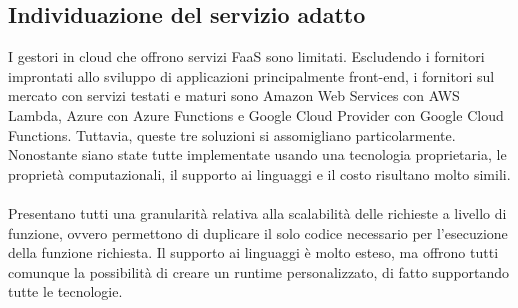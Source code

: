 \subsection{Individuazione del servizio adatto}

I gestori in cloud che offrono servizi FaaS sono limitati.
Escludendo i fornitori improntati allo sviluppo di applicazioni principalmente front-end,
i fornitori sul mercato con servizi testati e maturi sono
Amazon Web Services con AWS Lambda, 
Azure con Azure Functions e
Google Cloud Provider con Google Cloud Functions.
Tuttavia, queste tre soluzioni si assomigliano particolarmente.
Nonostante siano state tutte implementate usando una tecnologia proprietaria,
le proprietà computazionali, il supporto ai linguaggi e il costo risultano molto simili.\\
\\
Presentano tutti una granularità relativa
alla scalabilità delle richieste a livello di funzione,
ovvero permettono di duplicare il solo codice necessario per l'esecuzione della funzione richiesta.
Il supporto ai linguaggi è molto esteso,
ma offrono tutti comunque la possibilità di creare un runtime personalizzato,
di fatto supportando tutte le tecnologie.\\

